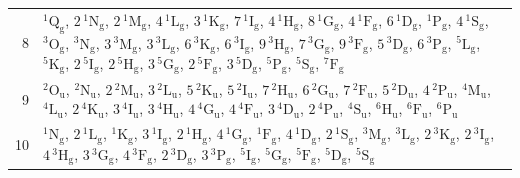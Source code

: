 \documentclass[10pt,a4paper]{article}
\numberwithin{equation}{section}
\newcommand{\spec}[1]{\mathrm{#1}}
\newcommand{\ptag}[1]{\mathrm{#1}}
\newcommand{\term}[2]{{}^{#1}#2}
\newlength{\fillwidth}\newlength{\cellwidth}\newlength{\colwidth}
\begin{document}
{\begin{longtable}{@{}r>{\RaggedRight\arraybackslash}p{\fillwidth}@{}}
8 & $\term{1}{\spec{Q}_{\ptag{g}}}$, $2\,\term{1}{\spec{N}_{\ptag{g}}}$, $2\,\term{1}{\spec{M}_{\ptag{g}}}$, $4\,\term{1}{\spec{L}_{\ptag{g}}}$, $3\,\term{1}{\spec{K}_{\ptag{g}}}$, $7\,\term{1}{\spec{I}_{\ptag{g}}}$, $4\,\term{1}{\spec{H}_{\ptag{g}}}$, $8\,\term{1}{\spec{G}_{\ptag{g}}}$, $4\,\term{1}{\spec{F}_{\ptag{g}}}$, $6\,\term{1}{\spec{D}_{\ptag{g}}}$, $\term{1}{\spec{P}_{\ptag{g}}}$, $4\,\term{1}{\spec{S}_{\ptag{g}}}$, $\term{3}{\spec{O}_{\ptag{g}}}$, $\term{3}{\spec{N}_{\ptag{g}}}$, $3\,\term{3}{\spec{M}_{\ptag{g}}}$, $3\,\term{3}{\spec{L}_{\ptag{g}}}$, $6\,\term{3}{\spec{K}_{\ptag{g}}}$, $6\,\term{3}{\spec{I}_{\ptag{g}}}$, $9\,\term{3}{\spec{H}_{\ptag{g}}}$, $7\,\term{3}{\spec{G}_{\ptag{g}}}$, $9\,\term{3}{\spec{F}_{\ptag{g}}}$, $5\,\term{3}{\spec{D}_{\ptag{g}}}$, $6\,\term{3}{\spec{P}_{\ptag{g}}}$, $\term{5}{\spec{L}_{\ptag{g}}}$, $\term{5}{\spec{K}_{\ptag{g}}}$, $2\,\term{5}{\spec{I}_{\ptag{g}}}$, $2\,\term{5}{\spec{H}_{\ptag{g}}}$, $3\,\term{5}{\spec{G}_{\ptag{g}}}$, $2\,\term{5}{\spec{F}_{\ptag{g}}}$, $3\,\term{5}{\spec{D}_{\ptag{g}}}$, $\term{5}{\spec{P}_{\ptag{g}}}$, $\term{5}{\spec{S}_{\ptag{g}}}$, $\term{7}{\spec{F}_{\ptag{g}}}$\\
9 & $\term{2}{\spec{O}_{\ptag{u}}}$, $\term{2}{\spec{N}_{\ptag{u}}}$, $2\,\term{2}{\spec{M}_{\ptag{u}}}$, $3\,\term{2}{\spec{L}_{\ptag{u}}}$, $5\,\term{2}{\spec{K}_{\ptag{u}}}$, $5\,\term{2}{\spec{I}_{\ptag{u}}}$, $7\,\term{2}{\spec{H}_{\ptag{u}}}$, $6\,\term{2}{\spec{G}_{\ptag{u}}}$, $7\,\term{2}{\spec{F}_{\ptag{u}}}$, $5\,\term{2}{\spec{D}_{\ptag{u}}}$, $4\,\term{2}{\spec{P}_{\ptag{u}}}$, $\term{4}{\spec{M}_{\ptag{u}}}$, $\term{4}{\spec{L}_{\ptag{u}}}$, $2\,\term{4}{\spec{K}_{\ptag{u}}}$, $3\,\term{4}{\spec{I}_{\ptag{u}}}$, $3\,\term{4}{\spec{H}_{\ptag{u}}}$, $4\,\term{4}{\spec{G}_{\ptag{u}}}$, $4\,\term{4}{\spec{F}_{\ptag{u}}}$, $3\,\term{4}{\spec{D}_{\ptag{u}}}$, $2\,\term{4}{\spec{P}_{\ptag{u}}}$, $\term{4}{\spec{S}_{\ptag{u}}}$, $\term{6}{\spec{H}_{\ptag{u}}}$, $\term{6}{\spec{F}_{\ptag{u}}}$, $\term{6}{\spec{P}_{\ptag{u}}}$\\
10 & $\term{1}{\spec{N}_{\ptag{g}}}$, $2\,\term{1}{\spec{L}_{\ptag{g}}}$, $\term{1}{\spec{K}_{\ptag{g}}}$, $3\,\term{1}{\spec{I}_{\ptag{g}}}$, $2\,\term{1}{\spec{H}_{\ptag{g}}}$, $4\,\term{1}{\spec{G}_{\ptag{g}}}$, $\term{1}{\spec{F}_{\ptag{g}}}$, $4\,\term{1}{\spec{D}_{\ptag{g}}}$, $2\,\term{1}{\spec{S}_{\ptag{g}}}$, $\term{3}{\spec{M}_{\ptag{g}}}$, $\term{3}{\spec{L}_{\ptag{g}}}$, $2\,\term{3}{\spec{K}_{\ptag{g}}}$, $2\,\term{3}{\spec{I}_{\ptag{g}}}$, $4\,\term{3}{\spec{H}_{\ptag{g}}}$, $3\,\term{3}{\spec{G}_{\ptag{g}}}$, $4\,\term{3}{\spec{F}_{\ptag{g}}}$, $2\,\term{3}{\spec{D}_{\ptag{g}}}$, $3\,\term{3}{\spec{P}_{\ptag{g}}}$, $\term{5}{\spec{I}_{\ptag{g}}}$, $\term{5}{\spec{G}_{\ptag{g}}}$, $\term{5}{\spec{F}_{\ptag{g}}}$, $\term{5}{\spec{D}_{\ptag{g}}}$, $\term{5}{\spec{S}_{\ptag{g}}}$\\

\end{longtable}}
\end{document}
